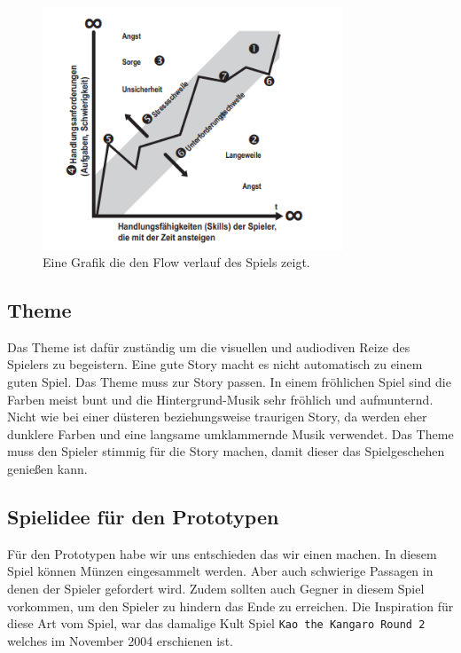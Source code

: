 \begin{figure}[H]
    \centering
    \includegraphics[width=0.8\textwidth]{chapters/15/images/GameFlow.png}
    \caption{Eine Grafik die den Flow verlauf des Spiels zeigt.}
    \label{UST-4}
\end{figure}


\subsection{Theme}
Das Theme ist dafür zuständig um die visuellen und audiodiven Reize des Spielers zu begeistern. Eine gute Story macht es nicht automatisch zu einem guten Spiel. Das Theme muss zur Story passen. In einem fröhlichen Spiel sind die Farben meist bunt und die Hintergrund-Musik sehr fröhlich und aufmunternd. Nicht wie bei einer düsteren beziehungsweise traurigen Story, da werden eher dunklere Farben und eine langsame umklammernde Musik verwendet. Das Theme muss den Spieler stimmig für die Story machen, damit dieser das Spielgeschehen genießen kann.



\subsection{Spielidee für den Prototypen}
Für den Prototypen habe wir uns entschieden das wir einen  machen. In diesem Spiel können Münzen eingesammelt werden. Aber auch schwierige Passagen in denen der Spieler gefordert wird. Zudem sollten auch Gegner in diesem Spiel vorkommen, um den Spieler zu hindern das Ende zu erreichen. Die Inspiration für diese Art vom Spiel, war das damalige Kult Spiel \verb+Kao the Kangaro Round 2+ welches im November 2004 erschienen ist.\\\\

